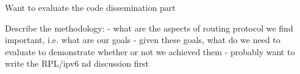 Want to evaluate the code dissemination part

Describe the methodology:
- what are the aspects of routing protocol we find important, i.e. what are our goals
- given these goals, what do we need to evaluate to demonstrate whether or not we achieved them
- probably want to write the RPL/ipv6 nd discussion first
\fi
